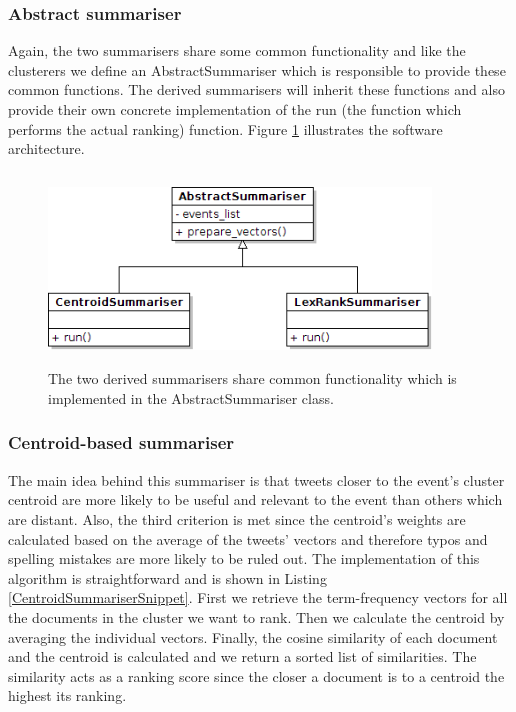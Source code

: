 \subsubsection{Abstract summariser}
Again, the two summarisers share some common functionality and like the clusterers we define an AbstractSummariser which is responsible to provide these common functions. The derived summarisers will inherit these functions and also provide their own concrete implementation of the run (the function which performs the actual ranking) function. Figure \ref{SummariserArchitecture} illustrates the software architecture. 

\begin{figure}[htbp]
  \begin{center}
    \includegraphics[height=2.0in, width=4in]{summarisers}
    \caption{The two derived summarisers share common functionality which is implemented in the AbstractSummariser class. }
    \label{SummariserArchitecture}
  \end{center}
\end{figure} 

\subsubsection{Centroid-based summariser}
The main idea behind this summariser is that tweets closer to the event's cluster centroid are more likely to be useful and relevant to the event than others which are distant. Also, the third criterion is met since the centroid's weights are calculated based on the average of the tweets' vectors and therefore typos and spelling mistakes are more likely to be ruled out. The implementation of this algorithm is straightforward and is shown in Listing \ref{CentroidSummariserSnippet}. First we retrieve the term-frequency vectors for all the documents in the cluster we want to rank. Then we calculate the centroid by averaging the individual vectors. Finally, the cosine similarity of each document and the centroid is calculated and we return a sorted list of similarities. The similarity acts as a ranking score since the closer a document is to a centroid the highest its ranking.  

